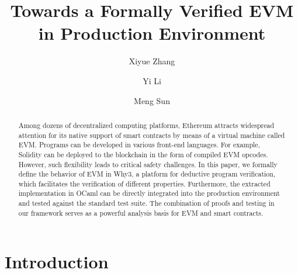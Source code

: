 \documentclass[runningheads]{llncs}
\begin{document}
\title{Towards a Formally Verified EVM in Production Environment}

\author{Xiyue Zhang \and
Yi Li \and
Meng Sun
}


\maketitle              %

\begin{abstract}
Among dozens of decentralized computing platforms, Ethe\-reum attracts widespread attention for its native support of smart contracts by means of a virtual machine called EVM. Programs can be developed in various front-end languages. For example, Solidity can be deployed to the blockchain in the form of compiled EVM opcodes. However, such flexibility leads to critical safety challenges. In this paper, we formally define the behavior of EVM in Why3, a platform for deductive program verification, which facilitates the verification of different properties. Furthermore, the extracted implementation in OCaml can be directly integrated into the production environment and tested against the standard test suite. The combination of proofs and testing in our framework serves as a powerful analysis basis for EVM and smart contracts.

\end{abstract}

\section{Introduction}
\end{document}
